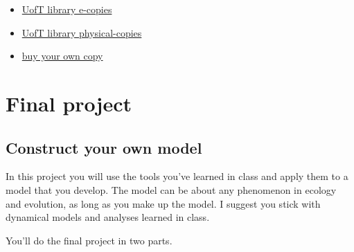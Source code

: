 \documentclass[
]{article}
\providecommand{\tightlist}{%
  \setlength{\itemsep}{0pt}\setlength{\parskip}{0pt}}
\begin{document}
\begin{itemize}
\tightlist
\item
  \href{https://librarysearch.library.utoronto.ca/permalink/01UTORONTO_INST/14bjeso/alma991106921343406196}{UofT
  library e-copies}
\item
  \href{https://librarysearch.library.utoronto.ca/permalink/01UTORONTO_INST/14bjeso/alma991106624476006196}{UofT
  library physical-copies}
\item
  \href{https://press.princeton.edu/books/hardcover/9780691123448/a-biologists-guide-to-mathematical-modeling-in-ecology-and-evolution}{buy
  your own copy}
\end{itemize}

\hypertarget{final-project}{%
\section{Final project}\label{final-project}}

\hypertarget{construct-your-own-model}{%
\subsection{Construct your own model}\label{construct-your-own-model}}

In this project you will use the tools you've learned in class and apply
them to a model that you develop. The model can be about any phenomenon
in ecology and evolution, as long as you make up the model. I suggest
you stick with dynamical models and analyses learned in class.

You'll do the final project in two parts.
\end{document}
